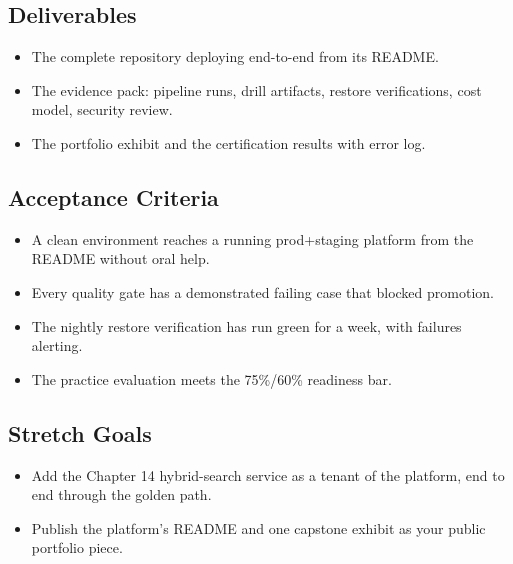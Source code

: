 \subsection*{Deliverables}
\begin{itemize}
    \item The complete repository deploying end-to-end from its README.
    \item The evidence pack: pipeline runs, drill artifacts, restore verifications, cost model, security review.
    \item The portfolio exhibit and the certification results with error log.
\end{itemize}

\subsection*{Acceptance Criteria}
\begin{itemize}
    \item A clean environment reaches a running prod+staging platform from the README without oral help.
    \item Every quality gate has a demonstrated failing case that blocked promotion.
    \item The nightly restore verification has run green for a week, with failures alerting.
    \item The practice evaluation meets the 75\%/60\% readiness bar.
\end{itemize}

\subsection*{Stretch Goals}
\begin{itemize}
    \item Add the Chapter 14 hybrid-search service as a tenant of the platform, end to end through the golden path.
    \item Publish the platform's README and one capstone exhibit as your public portfolio piece.
\end{itemize}
